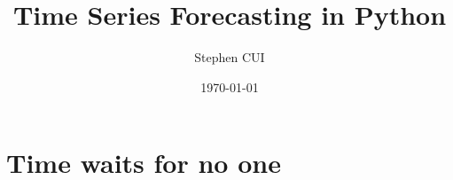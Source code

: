 \documentclass[openany]{book}
\title{Time Series Forecasting in Python}
\author{Stephen CUI}
\date{\today}
\begin{document}
\frontmatter
\maketitle
\tableofcontents
\mainmatter
\part{Time waits for no one}

\end{document}
